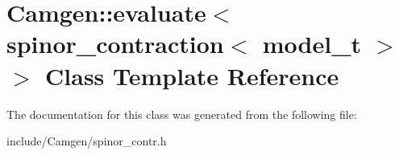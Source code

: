 \hypertarget{a00196}{}\section{Camgen\+:\+:evaluate$<$ spinor\+\_\+contraction$<$ model\+\_\+t $>$ $>$ Class Template Reference}
\label{a00196}


The documentation for this class was generated from the following file\+:\begin{DoxyCompactItemize}
\item 
include/\+Camgen/spinor\+\_\+contr.\+h\end{DoxyCompactItemize}
